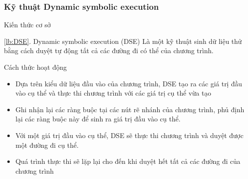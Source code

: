 \subsubsection*{Kỹ thuật Dynamic symbolic execution}
\label{lb:DSE}
\begin{frame}{Kiến thức cơ sở}
\begin{block}{\ref{lb:DSE}. Dynamic symbolic execution (DSE)}
Là một kỹ thuật sinh dữ liệu thử bằng cách duyệt tự động tất cả các đường đi 
có thể của chương trình.
\end{block} \pause
\begin{block}{Cách thức hoạt động}
\begin{itemize}
	\item Dựa trên kiểu dữ liệu đầu vào của chương trình, DSE tạo ra các giá
	trị đầu vào cụ thể và thực thi chương trình với các giá trị cụ thể vừa tạo \pause
	\item Ghi nhận lại các ràng buộc tại các nút rẽ nhánh của chương trình, 
	phủ định lại các ràng buộc này để sinh ra giá trị đầu vào cụ thể.\pause
	\item Với một giá trị đầu vào cụ thể, DSE sẽ thực thi chương trình và 
	duyệt được một đường đi cụ thể.\pause
	\item Quá trình thực thi sẽ lặp lại cho đến khi duyệt hết tất cả các
	đường đi của chương trình
\end{itemize}	


\end{block}
\end{frame}

